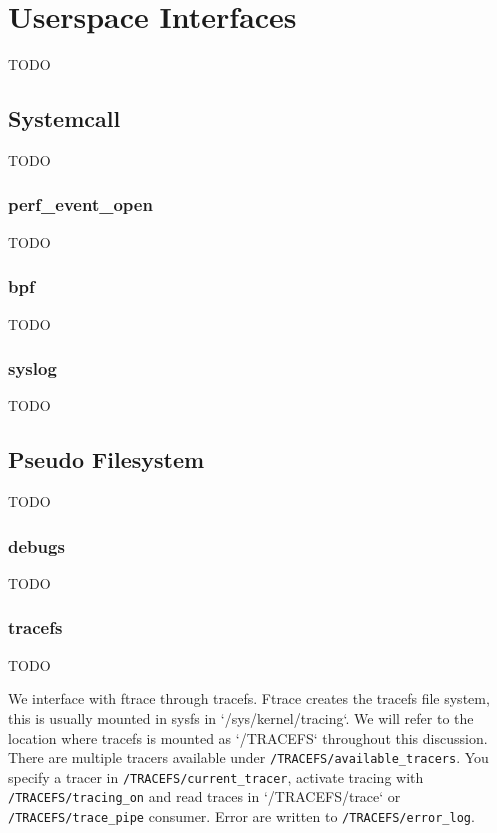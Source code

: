 \section{Userspace Interfaces}

TODO

\subsection{Systemcall}

TODO

\subsubsection*{perf\_event\_open}

TODO

\subsubsection*{bpf}

TODO

\subsubsection*{syslog}

TODO

\subsection{Pseudo Filesystem}

TODO

\subsubsection*{debugs}

TODO

\subsubsection*{tracefs}

TODO


We interface with ftrace through tracefs. Ftrace creates the tracefs file
system, this is usually mounted in sysfs in `/sys/kernel/tracing`. We will refer
to the location where tracefs is mounted as `/TRACEFS` throughout this
discussion. There are multiple tracers available under
\verb|/TRACEFS/available_tracers|.  You specify a tracer in
\verb|/TRACEFS/current_tracer|, activate tracing with \verb|/TRACEFS/tracing_on|
and read traces in `/TRACEFS/trace` or \verb|/TRACEFS/trace_pipe|
consumer. Error are written to \verb|/TRACEFS/error_log|.


